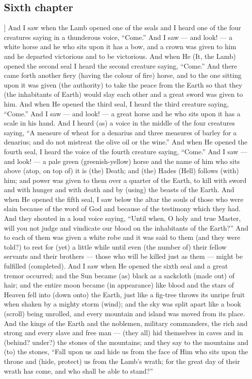 \begin{pages}
\begin{Rightside}
        			\chapter*{Sixth chapter}
				]
		And I saw when the Lamb opened one of the seals and I heard one of the four creatures saying in a thunderous voice, “Come.” And I saw — and look! — a white horse and he who sits upon it has a bow, and a crown was given to him and he departed victorious and to be victorious.
		\pend
		\pstart
		And when He (It, the Lamb) opened the second seal I heard the second creature saying, “Come.” And there came forth another fiery (having the colour of fire) horse, and to the one sitting upon it was given (the authority) to take the peace from the Earth so that they (the inhabitants of Earth) would slay each other and a great sword was given to him.
		\pend
		\pstart
		And when He opened the third seal, I heard the third creature saying, “Come.” And I saw — and look! — a great horse and he who sits upon it has a scale in his hand. And I heard (as) a voice in the middle of the four creatures saying, “A measure of wheat for a denarius and three measures of barley for a denarius; and do not mistreat the olive oil or the wine.”
		\pend
		\pstart
		And when He opened the fourth seal, I heard the voice of the fourth creature saying, “Come.” And I saw — and look! — a pale green (greenish-yellow) horse and the name of him who sits above (atop, on top of) it is (the) Death; and (the) Hades (Hell) follows (with) him; and power was given to them over a quarter of the Earth, to kill with sword and with hunger and with death and by (using) the beasts of the Earth.
		\pend
		\pstart
		And when He opened the fifth seal, I saw below the altar the souls of those who were slain because of the word of God and because of the testimony which they had. And they shouted in a loud voice saying, “Until when, O holy and true Master, will you not judge and vindicate our blood on the inhabitants of the Earth?” And to each of them was given a white robe and it was said to them (and they were told?) to rest for (yet) a little while until even (the number of) their fellow servants and their brothers — those who will be killed just as them — might be fulfilled (completed).
		\pend
		\pstart
		And I saw when He opened the sixth seal and a great tremor occurred; and the Sun became (as) black as a sackcloth (made out) of hair; and the entire moon became (in appearance) like blood and the stars of Heaven fell into (down onto) the Earth, just like a fig-tree throws its unripe fruit when shaken by a mighty storm (wind); and the sky was split apart like a book (scroll) being unrolled, and every mountain and island was moved from its place.
		\pend
		\pstart
		And the kings of the Earth and the noblemen, military commanders, the rich and strong and every slave and free man — (they all) hid themselves in caves and in (behind? under?) the stones of the mountains; and they say to the mountains and (to) the stones, “Fall upon us and hide us from the face of Him who sits upon the throne and (hide, protect) us from the Lamb’s wrath; for the great day of their wrath has come, and who shall be able to stand?”
		\pend
        \endnumbering
    \end{Rightside}

\end{pages} 
\Pages
